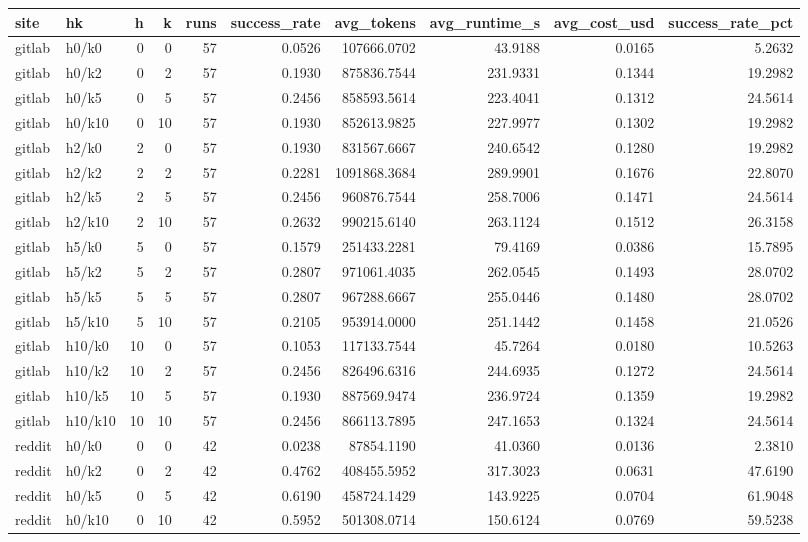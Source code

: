 \begin{tabular}{llrrrrrrrr}
\toprule
site & hk & h & k & runs & success_rate & avg_tokens & avg_runtime_s & avg_cost_usd & success_rate_pct \\
\midrule
gitlab & h0/k0 & 0 & 0 & 57 & 0.0526 & 107666.0702 & 43.9188 & 0.0165 & 5.2632 \\
gitlab & h0/k2 & 0 & 2 & 57 & 0.1930 & 875836.7544 & 231.9331 & 0.1344 & 19.2982 \\
gitlab & h0/k5 & 0 & 5 & 57 & 0.2456 & 858593.5614 & 223.4041 & 0.1312 & 24.5614 \\
gitlab & h0/k10 & 0 & 10 & 57 & 0.1930 & 852613.9825 & 227.9977 & 0.1302 & 19.2982 \\
gitlab & h2/k0 & 2 & 0 & 57 & 0.1930 & 831567.6667 & 240.6542 & 0.1280 & 19.2982 \\
gitlab & h2/k2 & 2 & 2 & 57 & 0.2281 & 1091868.3684 & 289.9901 & 0.1676 & 22.8070 \\
gitlab & h2/k5 & 2 & 5 & 57 & 0.2456 & 960876.7544 & 258.7006 & 0.1471 & 24.5614 \\
gitlab & h2/k10 & 2 & 10 & 57 & 0.2632 & 990215.6140 & 263.1124 & 0.1512 & 26.3158 \\
gitlab & h5/k0 & 5 & 0 & 57 & 0.1579 & 251433.2281 & 79.4169 & 0.0386 & 15.7895 \\
gitlab & h5/k2 & 5 & 2 & 57 & 0.2807 & 971061.4035 & 262.0545 & 0.1493 & 28.0702 \\
gitlab & h5/k5 & 5 & 5 & 57 & 0.2807 & 967288.6667 & 255.0446 & 0.1480 & 28.0702 \\
gitlab & h5/k10 & 5 & 10 & 57 & 0.2105 & 953914.0000 & 251.1442 & 0.1458 & 21.0526 \\
gitlab & h10/k0 & 10 & 0 & 57 & 0.1053 & 117133.7544 & 45.7264 & 0.0180 & 10.5263 \\
gitlab & h10/k2 & 10 & 2 & 57 & 0.2456 & 826496.6316 & 244.6935 & 0.1272 & 24.5614 \\
gitlab & h10/k5 & 10 & 5 & 57 & 0.1930 & 887569.9474 & 236.9724 & 0.1359 & 19.2982 \\
gitlab & h10/k10 & 10 & 10 & 57 & 0.2456 & 866113.7895 & 247.1653 & 0.1324 & 24.5614 \\
reddit & h0/k0 & 0 & 0 & 42 & 0.0238 & 87854.1190 & 41.0360 & 0.0136 & 2.3810 \\
reddit & h0/k2 & 0 & 2 & 42 & 0.4762 & 408455.5952 & 317.3023 & 0.0631 & 47.6190 \\
reddit & h0/k5 & 0 & 5 & 42 & 0.6190 & 458724.1429 & 143.9225 & 0.0704 & 61.9048 \\
reddit & h0/k10 & 0 & 10 & 42 & 0.5952 & 501308.0714 & 150.6124 & 0.0769 & 59.5238 \\

\end{tabular}
